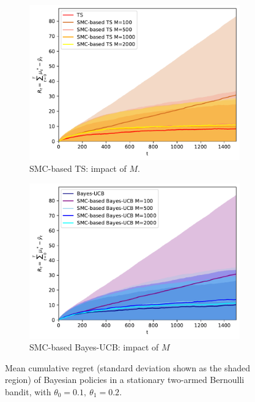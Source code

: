 \begin{figure}[!h]
	\begin{subfigure}[b]{0.46\textwidth}
		\centering
		\includegraphics[width=\textwidth]{./fods_figs/static/bernoulli/A2/theta0.1_0.2_allM_cumulative_regret_ts}
		\caption{SMC-based TS: impact of $M$.}
	\end{subfigure}
	\begin{subfigure}[b]{0.46\textwidth}
		\centering
		\includegraphics[width=\textwidth]{./fods_figs/static/bernoulli/A2/theta0.1_0.2_allM_cumulative_regret_bucb}
		\caption{SMC-based Bayes-UCB: impact of $M$}
	\end{subfigure}
	
	\caption{Mean cumulative regret (standard deviation shown as the shaded region) of Bayesian policies in a stationary two-armed Bernoulli bandit, with $\theta_0=0.1, \ \theta_1=0.2$.}
\end{figure}

